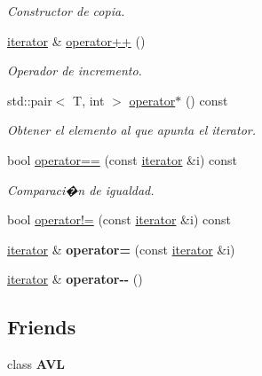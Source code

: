 \begin{DoxyCompactItemize}
\begin{DoxyCompactList}\small\item\em Constructor de copia. \end{DoxyCompactList}\item 
\hyperlink{classAVL_1_1iterator}{iterator} \& \hyperlink{classAVL_1_1iterator_a3a3faae96c4a6291e4a3bb5beaf70e4e}{operator++} ()
\begin{DoxyCompactList}\small\item\em Operador de incremento. \end{DoxyCompactList}\item 
std\-::pair$<$ T, int $>$ \hyperlink{classAVL_1_1iterator_aa15920d28cc0ca599f7e4c1af6018d17}{operator$\ast$} () const 
\begin{DoxyCompactList}\small\item\em Obtener el elemento al que apunta el iterator. \end{DoxyCompactList}\item 
bool \hyperlink{classAVL_1_1iterator_a7013fa8bae356623395419f1385d378a}{operator==} (const \hyperlink{classAVL_1_1iterator}{iterator} \&i) const 
\begin{DoxyCompactList}\small\item\em Comparaci�n de igualdad. \end{DoxyCompactList}\item 
bool \hyperlink{classAVL_1_1iterator_a36426619a9cc6439c48cb6e7a2a739ff}{operator!=} (const \hyperlink{classAVL_1_1iterator}{iterator} \&i) const 
\item 
\hypertarget{classAVL_1_1iterator_a12d8c5803081e2e4c1f1a48feb0c9a66}{\hyperlink{classAVL_1_1iterator}{iterator} \& {\bfseries operator=} (const \hyperlink{classAVL_1_1iterator}{iterator} \&i)}\label{classAVL_1_1iterator_a12d8c5803081e2e4c1f1a48feb0c9a66}

\item 
\hypertarget{classAVL_1_1iterator_ad5a8beb6fb9bff842016128459e90b90}{\hyperlink{classAVL_1_1iterator}{iterator} \& {\bfseries operator-\/-\/} ()}\label{classAVL_1_1iterator_ad5a8beb6fb9bff842016128459e90b90}

\end{DoxyCompactItemize}
\subsection*{Friends}
\begin{DoxyCompactItemize}
\item 
\hypertarget{classAVL_1_1iterator_acba9d79a1cae18f44a9bf4aa4d0de787}{class {\bfseries A\-V\-L}}\label{classAVL_1_1iterator_acba9d79a1cae18f44a9bf4aa4d0de787}

\end{DoxyCompactItemize}


